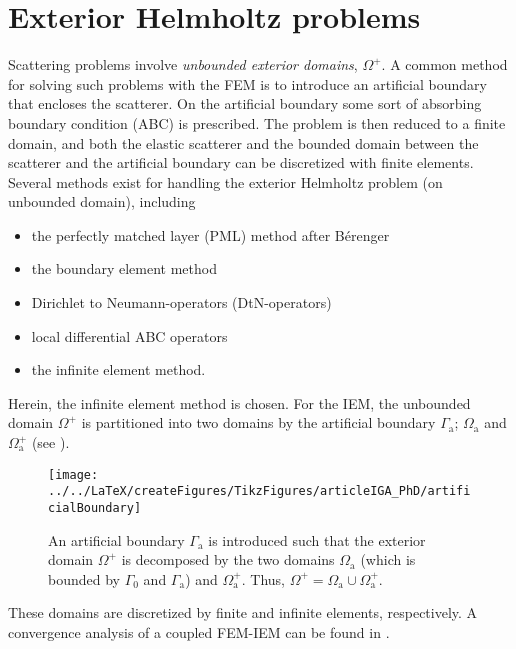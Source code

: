 \section{Exterior Helmholtz problems}
\label{Sec2:exteriorHelmholtz}
Scattering problems involve \textit{unbounded exterior domains}, $\Omega^+$. A common method for solving such problems with the FEM is to introduce an artificial boundary that encloses the scatterer. On the artificial boundary some sort of absorbing boundary condition (ABC) is prescribed. The problem is then reduced to a finite domain, and both the elastic scatterer and the bounded domain between the scatterer and the artificial boundary can be discretized with finite elements. Several methods exist for handling the exterior Helmholtz problem (on unbounded domain), including
\begin{itemize}
	\item the perfectly matched layer (PML) method after B{\'e}renger~\cite{Berenger1994apm,Berenger1996pml}
	\item the boundary element method~\cite{Sauter2011bem,Schanz2007bea,Marburg2008cao,Chandler_Wilde2012nab}
	\item Dirichlet to Neumann-operators (DtN-operators)~\cite{Givoli2013nmf}
	\item local differential ABC operators~\cite{Shirron1995soe,Bayliss1982bcf,Hagstrom1998afo,Tezaur2001tdf}
	\item the infinite element method.~\cite{Bettess1977ie,Bettess1977dar}
\end{itemize}
Herein, the infinite element method is chosen. For the IEM, the unbounded domain $\Omega^+$ is partitioned into two domains by the artificial boundary $\Gamma_{\mathrm{a}}$; $\Omega_{\mathrm{a}}$ and $\Omega_{\mathrm{a}}^+$ (see ). 
\begin{figure}
	\centering
	\texttt{[image: ../../LaTeX/createFigures/TikzFigures/articleIGA\_PhD/artificialBoundary]}
	\caption[Illustration of artificial boundary]{An artificial boundary $\Gamma_{\mathrm{a}}$ is introduced such that the exterior domain $\Omega^+$ is decomposed by the two domains $\Omega_{\mathrm{a}}$ (which is bounded by $\Gamma_0$ and $\Gamma_{\mathrm{a}}$) and $\Omega_{\mathrm{a}}^+$. Thus, $\Omega^+ = \Omega_{\mathrm{a}} \cup \Omega_{\mathrm{a}}^+$.}
	\label{Fig2:artificialBoundary}
\end{figure}
These domains are discretized by finite and infinite elements, respectively. A convergence analysis of a coupled FEM-IEM can be found in \cite{Demkowicz2001aoa}.

